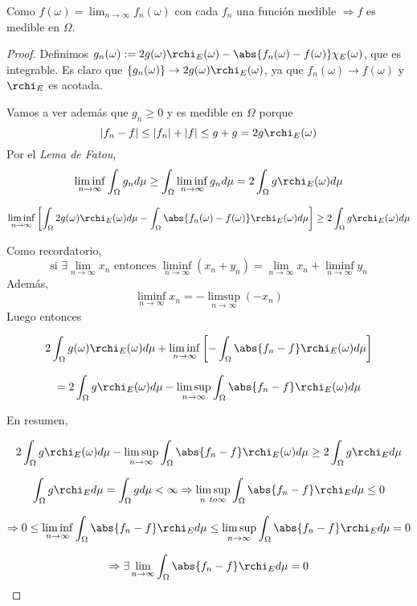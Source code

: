 \begin{nota}
  Como $f(\omega) = \lim_{n \to \infty} f_n(\omega)$ con cada $f_n$ una función medible $\Rightarrow f$ es medible en $\Omega$.
\end{nota}

\begin{proof}
  Definimos $g_n(\omega) := 2g(\omega)\rchi_E(\omega) - \abs{f_n(\omega) - f(\omega)} \chi_E (\omega)$, que es integrable. Es claro que $\{g_n(\omega)\} \rightarrow 2g(\omega)\rchi_E(\omega)$, ya que $f_n(\omega) \rightarrow f(\omega)$ y $\rchi_E$ es acotada.

  Vamos a ver además que $g_n \geq 0$ y es medible en $\Omega$ porque $$|f_n - f| \leq |f_n| + |f| \leq g + g = 2g\rchi_E(\omega)$$
  Por el \textit{Lema de Fatou},
  $$\liminf_{n \to \infty} \int_{\Omega} g_n d \mu \geq \int_{\Omega} \liminf_{n \to \infty} g_n d \mu = 2 \int_{\Omega} g\rchi_E(\omega)d\mu$$

  $$\liminf_{n \to \infty} \left[\int_{\Omega} 2g(\omega)\rchi_E(\omega) d\mu - \int_{\Omega} \abs{f_n(\omega) - f(\omega)}\rchi_E(\omega) d \mu \right] \geq 2\int_{\Omega} g\rchi_E(\omega) d \mu$$

  Como recordatorio, $$\text{si } \exists \lim_{n \to \infty} x_n \text{ entonces } \liminf_{n \to \infty} (x_n + y_n) = \lim_{n \to \infty} x_n + \liminf_{n \to \infty} y_n$$ Además, $$\liminf_{n \to \infty} x_n = - \limsup_{n \to \infty} (- x_n)$$
  Luego entonces

  $$2 \int_{\Omega} g(\omega)\rchi_E(\omega) d \mu + \liminf_{n \to \infty} \left[-\int_{\Omega} \abs{f_n - f} \rchi_E(\omega) d \mu \right]$$

  $$ = 2 \int_{\Omega} g \rchi_E(\omega) d \mu - \limsup_{n \to \infty} \int_{\Omega} \abs{f_n - f} \rchi_E(\omega) d \mu$$

  En resumen,

  $$2 \int_{\Omega} g \rchi_E(\omega) d \mu - \limsup_{n \to \infty} \int_{\Omega} \abs{f_n - f} \rchi_E(\omega) d \mu \geq 2 \int_{\Omega} g \rchi_{E} d \mu$$

  $$\int_{\Omega} g \rchi_{E} d \mu = \int_{\Omega} g  d \mu < \infty \Rightarrow \limsup_{n \ to \infty} \int_{\Omega} \abs{f_n - f} \rchi_E d \mu \leq 0$$

  $$\Rightarrow 0 \leq \liminf_{n \to \infty} \int_{\Omega} \abs{f_n - f} \rchi_E d \mu \leq \limsup_{n \to \infty} \int_{\Omega} \abs{f_n - f} \rchi_E d \mu = 0$$

  $$\Rightarrow \exists \lim_{n \to \infty} \int_{\Omega} \abs{f_n - f} \rchi_E d \mu = 0$$


\end{proof}
